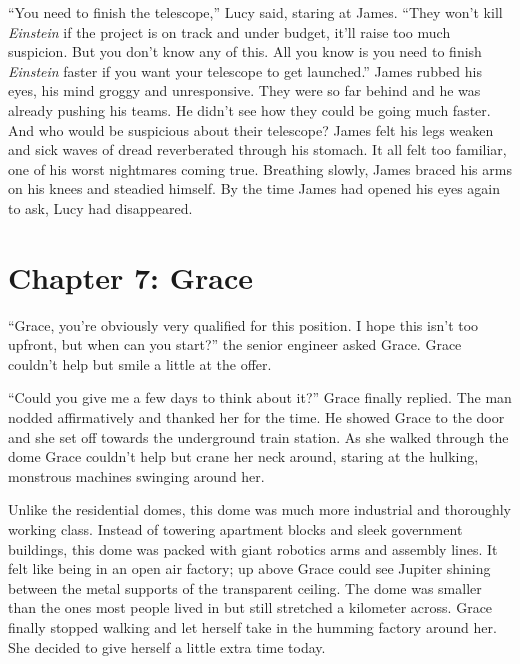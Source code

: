\documentclass[12pt]{article} %
\begin{document}
``You need to finish the telescope,'' Lucy said, staring at James. ``They won't kill \textit{Einstein} if the project is on track and under budget, it'll raise too much suspicion. But you don't know any of this. All you know is you need to finish \textit{Einstein} faster if you want your telescope to get launched.'' James rubbed his eyes, his mind groggy and unresponsive. They were so far behind and he was already pushing his teams. He didn't see how they could be going much faster. And who would be suspicious about their telescope? James felt his legs weaken and sick waves of dread reverberated through his stomach. It all felt too familiar, one of his worst nightmares coming true. Breathing slowly, James braced his arms on his knees and steadied himself. By the time James had opened his eyes again to ask, Lucy had disappeared.

\newpage
\section{Chapter 7: Grace}

``Grace, you're obviously very qualified for this position. I hope this isn't too upfront, but when can you start?'' the senior engineer asked Grace. Grace couldn't help but smile a little at the offer.

``Could you give me a few days to think about it?'' Grace finally replied. The man nodded affirmatively and thanked her for the time. He showed Grace to the door and she set off towards the underground train station. As she walked through the dome Grace couldn't help but crane her neck around, staring at the hulking, monstrous machines swinging around her. 

Unlike the residential domes, this dome was much more industrial and thoroughly working class. Instead of towering apartment blocks and sleek government buildings, this dome was packed with giant robotics arms and assembly lines. It felt like being in an open air factory; up above Grace could see Jupiter shining between the metal supports of the transparent ceiling. The dome was smaller than the ones most people lived in but still stretched a kilometer across. Grace finally stopped walking and let herself take in the humming factory around her. She decided to give herself a little extra time today.
\end{document}

